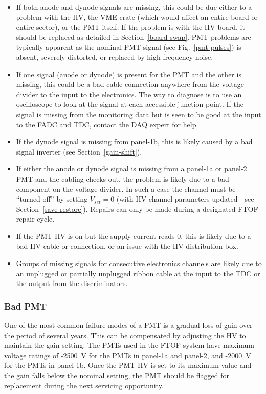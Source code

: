 \documentclass[12pt]{article}
\begin{document}
\begin{itemize}
\item If both anode and dynode signals are missing, this could be due either to a problem 
with the HV, the VME crate (which would affect an entire board or entire sector), or the 
PMT itself. If the problem is with the HV board, it should be replaced as detailed in 
Section~\ref{board-swap}. PMT problems are typically apparent as the nominal PMT signal 
(see Fig.~\ref{pmt-pulses}) is absent, severely distorted, or replaced by high frequency 
noise.
\item If one signal (anode or dynode) is present for the PMT and the other is missing, 
this could be a bad cable connection anywhere from the voltage divider to the input to 
the electronics. The way to diagnose is to use an oscilloscope to look at the signal at 
each accessible junction point. If the signal is missing from the monitoring data but is 
seen to be good at the input to the FADC and TDC, contact the DAQ expert for help.
\item If the dynode signal is missing from panel-1b, this is likely caused by a bad 
signal inverter (see Section~\ref{gain-shift}).
\item If either the anode or dynode signal is missing from a panel-1a or panel-2 PMT and 
the cabling checks out, the problem is likely due to a bad component on the voltage 
divider. In such a case the channel must be ``turned off'' by setting $V_{set}=0$ (with 
HV channel parameters updated - see Section~\ref{save-restore}). Repairs can only be 
made during a designated FTOF repair cycle.
\item If the PMT HV is on but the supply current reads 0, this is likely due to a bad 
HV cable or connection, or an issue with the HV distribution box.
\item Groups of missing signals for consecutive electronics channels are likely due to
an unplugged or partially unplugged ribbon cable at the input to the TDC or the output 
from the discriminators.
\end{itemize}

\subsubsection{Bad PMT}
\label{bad-pmt}

One of the most common failure modes of a PMT is a gradual loss of gain over the period 
of several years. This can be compensated by adjusting the HV to maintain the gain 
setting. The PMTs used in the FTOF system have maximum voltage ratings of -2500~V for 
the PMTs in panel-1a and panel-2, and -2000~V for the PMTs in panel-1b. Once the PMT HV 
is set to its maximum value and the gain falls below the nominal setting, the PMT should 
be flagged for replacement during the next servicing opportunity.
\end{document}
